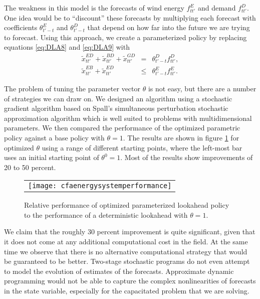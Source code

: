 \documentclass[11pt,oneside,fleqn,reqno,titlepage]{article}
\newcommand{\bn}{\begin{eqnarray}}
\newcommand{\en}{\end{eqnarray}}
\def \xtilde{{\tilde x}}
\begin{document}
The weakness in this model is the forecasts of wind energy $f^E_{tt'}$ and demand $f^D_{tt'}$.  One idea would be to ``discount'' these forecasts by multiplying each forecast with coefficients $\theta^E_{t'-t}$ and $\theta^D_{t'-t}$ that depend on how far into the future we are trying to forecast.  Using this approach, we create a parameterized policy by replacing equations \eqref{eq:DLA8} and \eqref{eq:DLA9} with
\bn
\xtilde^{ED}_{tt'} + \xtilde^{BD}_{tt'} + \xtilde^{GD}_{tt'} & = & \theta^D_{t'-t}f^D_{tt'},\label{eq:DLA8a}\\
\xtilde^{EB}_{tt'} + \xtilde^{ED}_{tt'}  & \leq & \theta^E_{t'-t}f^E_{tt'}. \label{eq:DLA9a}
\en


The problem of tuning the parameter vector $\theta$ is not easy, but there are a number of strategies we can draw on.  We designed an algorithm \citep{Ghadimi2022} using a stochastic gradient algorithm based on Spall's simultaneous perturbation stochastic approximation algorithm \cite{spall2005introduction} which is well suited to problems with multidimensional parameters.  We then compared the performance of the optimized parametric policy against a base policy with $\theta = 1$.  The results are shown in figure \ref{fig:cfaenergysystemperformance} for optimized $\theta$ using a range of different starting points, where the left-most bar uses an initial starting point of $\theta^0 = 1$.  Most of the results show improvements of 20 to 50 percent.
\begin{figure}[tb]
\begin{center}
\begin{tabular}{c}
\texttt{[image: cfaenergysystemperformance]}
\end{tabular}
\caption{Relative performance of optimized parameterized lookahead policy to the performance of a deterministic lookahead with $\theta = 1$.}
\label{fig:cfaenergysystemperformance}
\end{center}
\end{figure}

We claim that the roughly 30 percent improvement is quite significant, given that it does not come at any additional computational cost in the field.  At the same time we observe that there is no alternative computational strategy that would be guaranteed to be better.  Two-stage stochastic programs do not even attempt to model the evolution of estimates of the forecasts.  Approximate dynamic programming would not be able to capture the complex nonlinearities of forecasts in the state variable, especially for the capacitated problem that we are solving.
\end{document}
